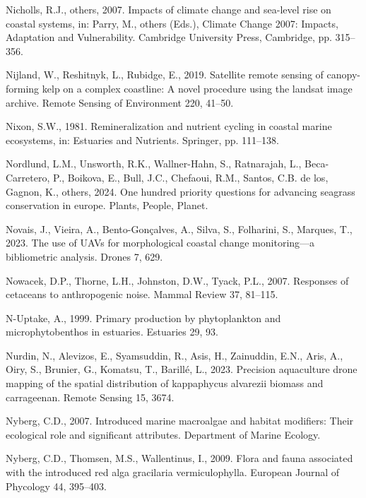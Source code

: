\documentclass[
  letterpaper,
  11pt,
  english,
  singlespacing,
  headsepline]{MastersDoctoralThesis}
\newlength{\cslhangindent}
\newenvironment{CSLReferences}[2] %
 {\begin{list}{}{%
  \setlength{\itemindent}{0pt}
  \setlength{\leftmargin}{0pt}
  \setlength{\parsep}{0pt}
  \ifodd #1
   \setlength{\leftmargin}{\cslhangindent}
   \setlength{\itemindent}{-1\cslhangindent}
  \fi
  \setlength{\itemsep}{#2\baselineskip}}}
 {\end{list}}
\begin{document}
\begin{CSLReferences}{1}{0}
Nicholls, R.J., others, 2007. Impacts of climate change and sea-level
rise on coastal systems, in: Parry, M., others (Eds.), Climate Change
2007: Impacts, Adaptation and Vulnerability. Cambridge University Press,
Cambridge, pp. 315--356.

Nijland, W., Reshitnyk, L., Rubidge, E., 2019. Satellite remote sensing
of canopy-forming kelp on a complex coastline: A novel procedure using
the landsat image archive. Remote Sensing of Environment 220, 41--50.

Nixon, S.W., 1981. Remineralization and nutrient cycling in coastal
marine ecosystems, in: Estuaries and Nutrients. Springer, pp. 111--138.

Nordlund, L.M., Unsworth, R.K., Wallner-Hahn, S., Ratnarajah, L.,
Beca-Carretero, P., Boikova, E., Bull, J.C., Chefaoui, R.M., Santos,
C.B. de los, Gagnon, K., others, 2024. One hundred priority questions
for advancing seagrass conservation in europe. Plants, People, Planet.

Novais, J., Vieira, A., Bento-Gonçalves, A., Silva, S., Folharini, S.,
Marques, T., 2023. The use of UAVs for morphological coastal change
monitoring---a bibliometric analysis. Drones 7, 629.

Nowacek, D.P., Thorne, L.H., Johnston, D.W., Tyack, P.L., 2007.
Responses of cetaceans to anthropogenic noise. Mammal Review 37,
81--115.

N-Uptake, A., 1999. Primary production by phytoplankton and
microphytobenthos in estuaries. Estuaries 29, 93.

Nurdin, N., Alevizos, E., Syamsuddin, R., Asis, H., Zainuddin, E.N.,
Aris, A., Oiry, S., Brunier, G., Komatsu, T., Barillé, L., 2023.
Precision aquaculture drone mapping of the spatial distribution of
kappaphycus alvarezii biomass and carrageenan. Remote Sensing 15, 3674.

Nyberg, C.D., 2007. Introduced marine macroalgae and habitat modifiers:
Their ecological role and significant attributes. Department of Marine
Ecology.

Nyberg, C.D., Thomsen, M.S., Wallentinus, I., 2009. Flora and fauna
associated with the introduced red alga gracilaria vermiculophylla.
European Journal of Phycology 44, 395--403.


\end{CSLReferences}
\end{document}
